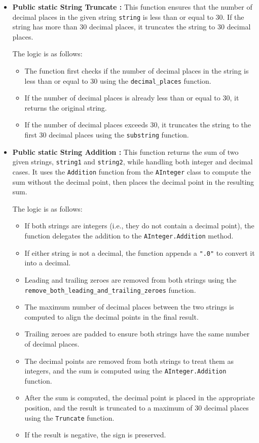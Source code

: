 \documentclass{article}
\begin{document}
\begin{itemize}
\item \textbf{Public static String Truncate :} 
This function ensures that the number of decimal places in the given string \texttt{string} is less than or equal to 30. If the string has more than 30 decimal places, it truncates the string to 30 decimal places.

The logic is as follows:
\begin{itemize}
    \item The function first checks if the number of decimal places in the string is less than or equal to 30 using the \texttt{decimal\_places} function.
    \item If the number of decimal places is already less than or equal to 30, it returns the original string.
    \item If the number of decimal places exceeds 30, it truncates the string to the first 30 decimal places using the \texttt{substring} function.\\
\end{itemize}

\item \textbf{Public static String Addition :} 
This function returns the sum of two given strings, \texttt{string1} and \texttt{string2}, while handling both integer and decimal cases. It uses the \texttt{Addition} function from the \texttt{AInteger} class to compute the sum without the decimal point, then places the decimal point in the resulting sum.

The logic is as follows:
\begin{itemize}
    \item If both strings are integers (i.e., they do not contain a decimal point), the function delegates the addition to the \texttt{AInteger.Addition} method.
    \item If either string is not a decimal, the function appends a \texttt{".0"} to convert it into a decimal.
    \item Leading and trailing zeroes are removed from both strings using the \texttt{remove\_both\_leading\_and\_trailing\_zeroes} function.
    \item The maximum number of decimal places between the two strings is computed to align the decimal points in the final result.
    \item Trailing zeroes are padded to ensure both strings have the same number of decimal places.
    \item The decimal points are removed from both strings to treat them as integers, and the sum is computed using the \texttt{AInteger.Addition} function.
    \item After the sum is computed, the decimal point is placed in the appropriate position, and the result is truncated to a maximum of 30 decimal places using the \texttt{Truncate} function.
    \item If the result is negative, the sign is preserved.\\
\end{itemize}


\end{itemize}
\end{document}
